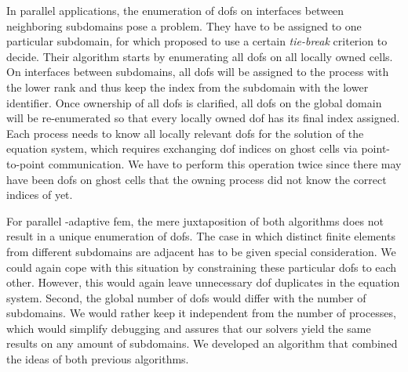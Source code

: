 



In parallel applications, the enumeration of \glspl{dof} on interfaces between neighboring subdomains pose a problem. They have to be assigned to one particular subdomain, for which \textcite[Sec.~3.1]{bangerth2012} proposed to use a certain \textit{tie-break} criterion to decide. Their algorithm starts by enumerating all \glspl{dof} on all locally owned cells. On interfaces between subdomains, all \glspl{dof} will be assigned to the process with the lower rank and thus keep the index from the subdomain with the lower identifier. Once ownership of all \glspl{dof} is clarified, all \glspl{dof} on the global domain will be re-enumerated so that every locally owned \gls{dof} has its final index assigned. Each process needs to know all locally relevant \glspl{dof} for the solution of the equation system, which requires exchanging \gls{dof} indices on ghost cells via point-to-point communication. We have to perform this operation twice since there may have been \glspl{dof} on ghost cells that the owning process did not know the correct indices of yet.


For parallel \hp-adaptive \gls{fem}, the mere juxtaposition of both algorithms does not result in a unique enumeration of \glspl{dof}. The case in which distinct finite elements from different subdomains are adjacent has to be given special consideration. We could again cope with this situation by constraining these particular \glspl{dof} to each other. However, this would again leave unnecessary \gls{dof} duplicates in the equation system. Second, the global number of \glspl{dof} would differ with the number of subdomains. We would rather keep it independent from the number of processes, which would simplify debugging and assures that our solvers yield the same results on any amount of subdomains. We developed an algorithm that combined the ideas of both previous algorithms.

